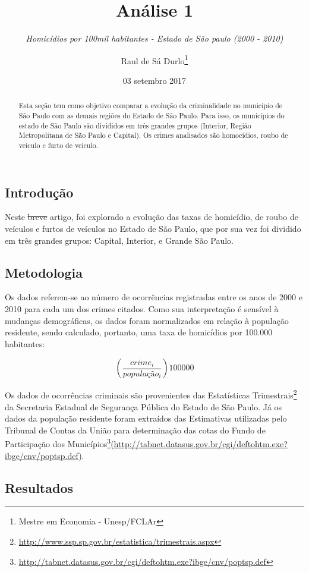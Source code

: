 \documentclass[]{article}
\title{Análise 1}
\subtitle{\emph{Homicídios por 100mil habitantes - Estado de São paulo (2000 -
2010)}}
\author{Raul de Sá Durlo\footnote{Mestre em Economia - Unesp/FCLAr}}
\date{03 setembro 2017}
\let\rmarkdownfootnote\footnote%
\def\footnote{\protect\rmarkdownfootnote}
\begin{document}
\maketitle
\begin{abstract}
Esta seção tem como objetivo comparar a evolução da criminalidade no
município de São Paulo com as demais regiões do Estado de São Paulo.
Para isso, os municípios do estado de São Paulo são divididos em três
grandes grupos (Interior, Região Metropolitana de São Paulo e Capital).
Os crimes analisados são homocídios, roubo de veículo e furto de
veículo.
\end{abstract}

{
\setcounter{tocdepth}{2}
\tableofcontents
}
\subsection{Introdução}\label{introducao}

Neste \sout{breve} artigo, foi explorado a evolução das taxas de
homicídio, de roubo de veículos e furtos de veículos no Estado de São
Paulo, que por sua vez foi dividido em três grandes grupos: Capital,
Interior, e Grande São Paulo.

\subsection{Metodologia}\label{metodologia}

Os dados referem-se ao número de ocorrências registradas entre os anos
de 2000 e 2010 para cada um dos crimes citados. Como sua interpretação é
sensível à mudanças demográficas, os dados foram normalizados em relação
à população residente, sendo calculado, portanto, uma taxa de homicídios
por 100.000 habitantes:

\[\left(\frac{crime_i}{população_i}\right)100000\]

Os dados de ocorrências criminais são provenientes das Estatísticas
Trimestrais\footnote{\url{http://www.ssp.sp.gov.br/estatistica/trimestrais.aspx}}
da Secretaria Estadual de Segurança Pública do Estado de São Paulo. Já
os dados da população residente foram extraídos das Estimativas
utilizadas pelo Tribunal de Contas da União para determinação das cotas
do Fundo de Participação dos Municípios\footnote{\url{http://tabnet.datasus.gov.br/cgi/deftohtm.exe?ibge/cnv/poptsp.def}}(\url{http://tabnet.datasus.gov.br/cgi/deftohtm.exe?ibge/cnv/poptsp.def}).

\subsection{Resultados}\label{resultados}
\end{document}
